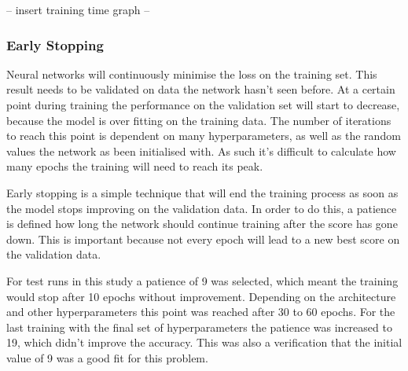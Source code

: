 -- insert training time graph --

\subsubsection{Early Stopping}

Neural networks will continuously minimise the loss on the training set. This result needs to be validated on data the network hasn't seen before. At a certain point during training the performance on the validation set will start to decrease, because the model is over fitting on the training data. The number of iterations to reach this point is dependent on many hyperparameters, as well as the random values the network as been initialised with. As such it's difficult to calculate how many epochs the training will need to reach its peak.

Early stopping is a simple technique that will end the training process as soon as the model stops improving on the validation data. In order to do this, a patience is defined how long the network should continue training after the score has gone down. This is important because not every epoch will lead to a new best score on the validation data.

For test runs in this study a patience of 9 was selected, which meant the training would stop after 10 epochs without improvement. Depending on the architecture and other hyperparameters this point was reached after 30 to 60 epochs. For the last training with the final set of hyperparameters the patience was increased to 19, which didn't improve the accuracy.  This was also a verification that the initial value of 9 was a good fit for this problem.



\newpage
